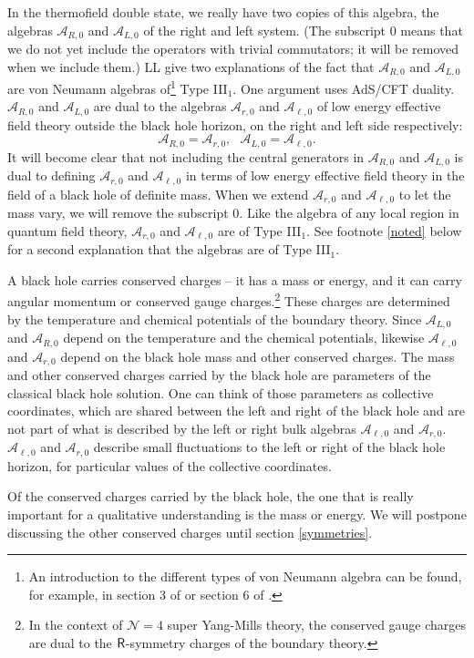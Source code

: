 \documentclass[11pt,a4paper]{article}
\def\be{\begin{equation}}
\def\ee{\end{equation}}
\def\A{{\mathcal A}}
\def\N{{\mathcal N}}
\def\Rr{{\sf R}}
\begin{document}
In the thermofield double state, we really have two copies of this algebra, the algebras $\A_{R,0}$ and $\A_{L,0}$ of the right and left system.   (The subscript
0 means that we do not yet include the operators with trivial commutators; it will be removed when we include them.)
LL give two explanations of the fact that $\A_{R,0}$ and $\A_{L,0}$ are von Neumann algebras of\footnote{An introduction to the different
types of von Neumann algebra can be found, for example, in section 3 of \cite{Lecture} or section 6 of \cite{OlderLectures}.}  Type III$_1$.   One argument uses
AdS/CFT duality.   $\A_{R,0}$ and $\A_{L,0}$ are dual to the algebras $\A_{r,0}$ and $\A_{\ell,0}$ of low energy effective field theory outside the black hole
horizon, on the right and left side respectively:
\be\label{firstside} \A_{R,0}=\A_{r,0},~~~ \A_{L,0}=\A_{\ell,0}. \ee    
It will become clear that not including the central generators in $\A_{R,0}$ and $\A_{L,0}$ is dual to defining $\A_{r,0}$ and $\A_{\ell,0}$ in terms of
low energy effective field theory in the field of a black hole of definite mass.
   When we extend $\A_{r,0}$ and $\A_{\ell,0}$ to  let the mass vary, we will remove the subscript 0.
Like the algebra of any local region  in quantum field theory, $\A_{r,0} $ and $\A_{\ell,0}$ are of Type III$_1$.   See footnote \ref{noted} below for
a second explanation that the algebras are of Type III$_1$. 

A black hole carries conserved charges -- it has a mass or energy, and it can carry angular momentum or conserved gauge charges.\footnote{In the context
of $\N=4$ super Yang-Mills theory, the conserved gauge charges are dual to the $\Rr$-symmetry charges of
the boundary theory.}    These charges are determined by the temperature and chemical potentials of the boundary theory.  Since $\A_{L,0}$ and $\A_{R,0}$ depend on
the temperature and the chemical potentials, likewise $\A_{\ell,0}$ and $\A_{r,0}$ depend on the black hole mass and other conserved charges.
 The mass and other conserved charges carried by 
 the black hole are  parameters of the classical black hole solution.  One can think of those parameters as collective coordinates, which are shared between the left and right of the black hole and are 
not part of what is described by the left or right bulk algebras $\A_{\ell,0}$ and $\A_{r,0}$.   $\A_{\ell,0}$ and $\A_{r,0}$  describe small
fluctuations to the left or right of the black hole horizon, for particular values of the collective coordinates.   

Of the conserved charges carried by the black hole, the one that is really important for a qualitative understanding is the mass or energy.   We will postpone
discussing the other conserved charges until section \ref{symmetries}.
\end{document}
